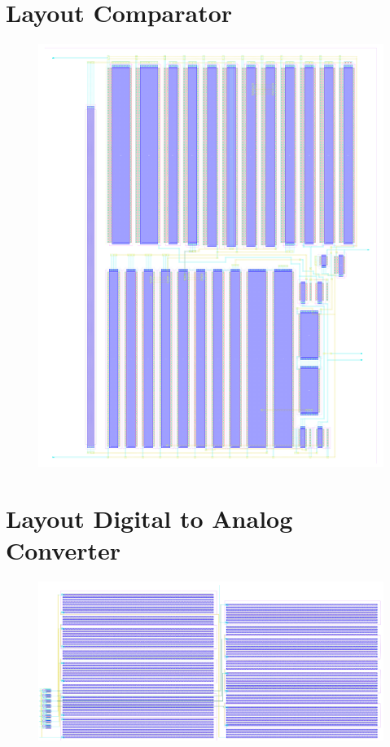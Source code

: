 \documentclass[english, 12pt, a4paper]{ifimaster}
\begin{document}
\begin{appendices}
\newpage
\section{Layout Comparator}
\begin{figure}[!ht]
 \centering
 \includegraphics[width=12cm, angle=90]{img/layout/comparator}
\end{figure}

\newpage
\section{Layout Digital to Analog Converter}
\begin{figure}[!ht]
 \centering
 \includegraphics[width=20cm, angle=90]{img/layout/dac}
\end{figure}


\end{appendices}
\end{document}

